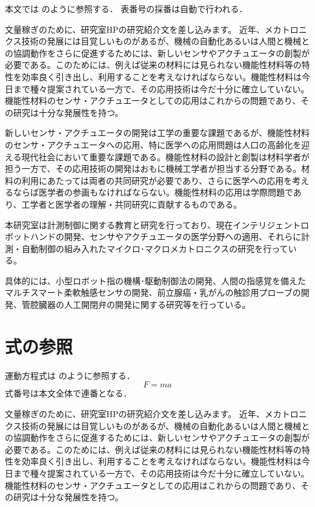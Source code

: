 \documentclass[../main.tex]{subfiles} %
\begin{document}
本文では  のように参照する．
表番号の採番は自動で行われる．

文量稼ぎのために、研究室HPの研究紹介文を差し込みます。 近年、メカトロニクス技術の発展には目覚しいものがあるが、機械の自動化あるいは人間と機械との協調動作をさらに促進するためには、新しいセンサやアクチュエータの創製が必要である。このためには、例えば従来の材料には見られない機能性材料等の特性を効率良く引き出し、利用することを考えなければならない。機能性材料は今日まで種々提案されている一方で、その応用技術は今だ十分に確立していない。機能性材料のセンサ・アクチュエータとしての応用はこれからの問題であり、その研究は十分な発展性を持つ。

新しいセンサ・アクチュエータの開発は工学の重要な課題であるが、機能性材料のセンサ・アクチュエータへの応用、特に医学への応用問題は人口の高齢化を迎える現代社会において重要な課題である。機能性材料の設計と創製は材料学者が担う一方で、その応用技術の開発はおもに機械工学者が担当する分野である。材料の利用にあたっては両者の共同研究が必要であり、さらに医学への応用を考えるならば医学者の参画もなければならない。機能性材料の応用は学際問題であり、工学者と医学者の理解・共同研究に貢献するものである。

本研究室は計測制御に関する教育と研究を行っており、現在インテリジェントロボットハンドの開発、センサやアクチュエータの医学分野への適用、それらに計測・自動制御の組み入れたマイクロ･マクロメカトロニクスの研究を行っている。

具体的には、小型ロボット指の機構･駆動制御法の開発、人間の指感覚を備えたマルチスマート柔軟触感センサの開発、前立腺癌・乳がんの触診用プローブの開発、管腔臓器の人工開閉弁の開発に関する研究等を行っている。



\section{式の参照}
運動方程式は  のように参照する．
\begin{equation}
  \label{eq:newton}
  F = m a
\end{equation}
式番号は本文全体で連番となる．

文量稼ぎのために、研究室HPの研究紹介文を差し込みます。 近年、メカトロニクス技術の発展には目覚しいものがあるが、機械の自動化あるいは人間と機械との協調動作をさらに促進するためには、新しいセンサやアクチュエータの創製が必要である。このためには、例えば従来の材料には見られない機能性材料等の特性を効率良く引き出し、利用することを考えなければならない。機能性材料は今日まで種々提案されている一方で、その応用技術は今だ十分に確立していない。機能性材料のセンサ・アクチュエータとしての応用はこれからの問題であり、その研究は十分な発展性を持つ。
\end{document}
